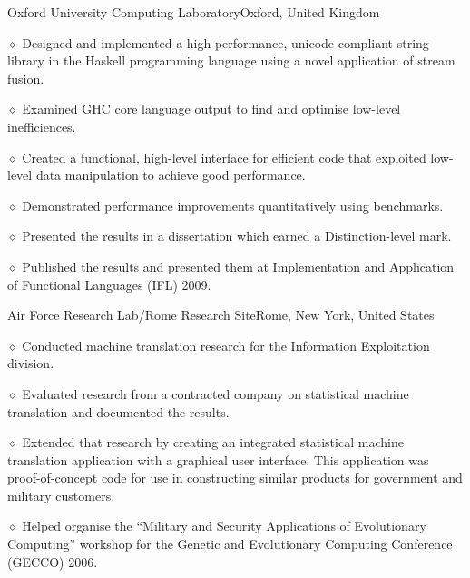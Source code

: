 \bigskip

{Oxford University Computing Laboratory}{Oxford, United Kingdom}
\medskip

\parindent=20pt
\item{$\diamond$} Designed and implemented a high-performance, unicode
compliant string library
in the Haskell programming language using a novel application of
stream fusion.
\item{$\diamond$} Examined GHC core language output to find and optimise
low-level inefficiences.
\item{$\diamond$} Created a functional, high-level interface for
efficient code that exploited low-level data manipulation to achieve
good performance.
\item{$\diamond$} Demonstrated performance improvements quantitatively using benchmarks.
\item{$\diamond$} Presented the results in a dissertation which earned a Distinction-level mark.
\item{$\diamond$} Published the results and presented them at
Implementation and Application of Functional Languages (IFL) 2009.

\bigskip

{Air Force Research Lab/Rome Research Site}{Rome, New York, United States}
\medskip

\parindent=20pt
\item{$\diamond$} Conducted machine translation research for the
Information Exploitation division.
\item{$\diamond$} Evaluated research from a contracted company on
statistical machine translation and documented the results. 
\item{$\diamond$} Extended that research
by creating an integrated statistical machine translation application
with a graphical user interface. This application was
proof-of-concept code for use in constructing similar products for
government and military customers. 
\item{$\diamond$} Helped organise the “Military and Security
Applications of Evolutionary Computing” workshop for the Genetic and
Evolutionary Computing Conference (GECCO) 2006.
\parindent=0pt

\bigskip


\medskip 

